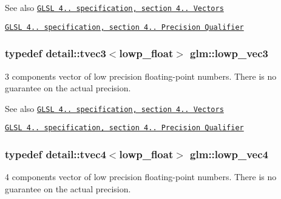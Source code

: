 \begin{DoxySeeAlso}{\-See also}
\href{http://www.opengl.org/registry/doc/GLSLangSpec.4.20.8.pdf}{\tt \-G\-L\-S\-L 4.. specification, section 4.. \-Vectors} 

\href{http://www.opengl.org/registry/doc/GLSLangSpec.4.20.8.pdf}{\tt \-G\-L\-S\-L 4.. specification, section 4.. \-Precision \-Qualifier} 
\end{DoxySeeAlso}
\hypertarget{group__core__precision_gaacc50c233ef2759c852eb90be78bc5fc}{
\subsubsection[{lowp\-\_\-vec3}]{\setlength{\rightskip}{0pt plus 5cm}typedef detail\-::tvec3$<$lowp\-\_\-float$>$ {\bf glm\-::lowp\-\_\-vec3}}}\label{group__core__precision_gaacc50c233ef2759c852eb90be78bc5fc}
3 components vector of low precision floating-\/point numbers. \-There is no guarantee on the actual precision.

\begin{DoxySeeAlso}{\-See also}
\href{http://www.opengl.org/registry/doc/GLSLangSpec.4.20.8.pdf}{\tt \-G\-L\-S\-L 4.. specification, section 4.. \-Vectors} 

\href{http://www.opengl.org/registry/doc/GLSLangSpec.4.20.8.pdf}{\tt \-G\-L\-S\-L 4.. specification, section 4.. \-Precision \-Qualifier} 
\end{DoxySeeAlso}
\hypertarget{group__core__precision_gabc7a12b5fe2a8b5b4d11961c284637dc}{
\subsubsection[{lowp\-\_\-vec4}]{\setlength{\rightskip}{0pt plus 5cm}typedef detail\-::tvec4$<$lowp\-\_\-float$>$ {\bf glm\-::lowp\-\_\-vec4}}}\label{group__core__precision_gabc7a12b5fe2a8b5b4d11961c284637dc}
4 components vector of low precision floating-\/point numbers. \-There is no guarantee on the actual precision.


